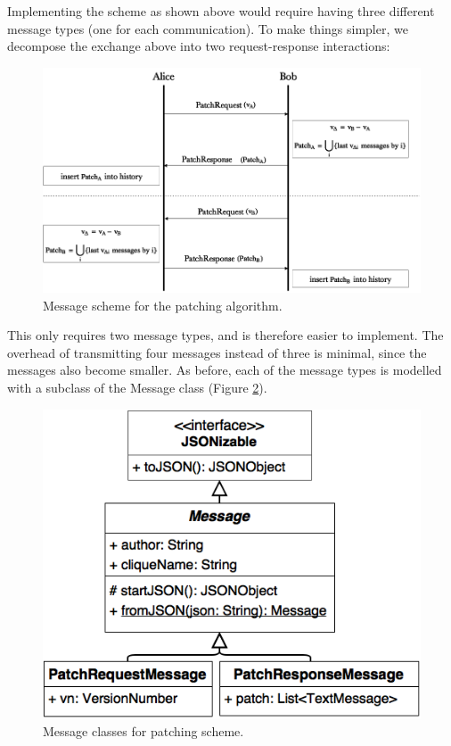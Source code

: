 \documentclass[a4paper, twoside, 12pt]{report}
\begin{document}
Implementing the scheme as shown above would require having three different message types (one for each communication). To make things simpler, we decompose the exchange above into two request-response interactions:

\begin{figure}[H]
    \captionsetup{width=0.76\textwidth}
    \centering
    \includegraphics[width=0.8\linewidth]{pics/patching_modified.png}
    \caption{\label{fig:patching_modified} Message scheme for the patching algorithm.}
\end{figure}

This only requires two message types, and is therefore easier to implement. The overhead of transmitting four messages instead of three is minimal, since the messages also become smaller. As before, each of the message types is modelled with a subclass of the Message class (Figure \ref{fig:patching_messages_uml}).

\begin{figure}[H]
    \captionsetup{width=0.76\textwidth}
    \centering
    \includegraphics[width=0.6\linewidth]{pics/patching_messages_uml.png}
    \caption{\label{fig:patching_messages_uml} Message classes for patching scheme. }
\end{figure}
\end{document}
